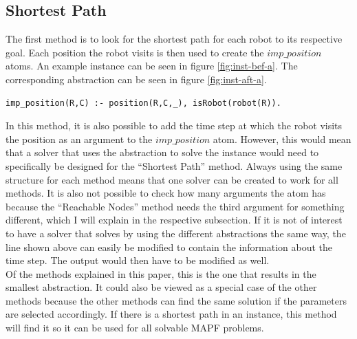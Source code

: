 \documentclass[runningheads]{llncs}
\begin{document}
\subsection{Shortest Path}
The first method is to look for the shortest path for each robot to its respective goal. Each position the robot visits is then used to create the $imp\_position$ atoms. An example instance can be seen in figure \ref{fig:inst-bef-a}. The corresponding abstraction can be seen in figure \ref{fig:inst-aft-a}.
\begin{verbatim}
imp_position(R,C) :- position(R,C,_), isRobot(robot(R)).
\end{verbatim}
In this method, it is also possible to add the time step at which the robot visits the position as an argument to the $imp\_position$ atom. However, this would mean that a solver that uses the abstraction to solve the instance would need to specifically
be designed for the ``Shortest Path'' method. Always using the same structure for each method means that one solver can be created to work for all methods. It is also not possible to check how many arguments the atom has because the 
``Reachable Nodes'' method needs the third argument for something different, which I will explain in the respective subsection. If it is not of interest to have a solver that solves by using the different abstractions the same way, the line shown above can 
easily be modified to contain the information about the time step. The output would then have to be modified as well. \\
Of the methods explained in this paper, this is the one that results in the smallest abstraction. It could also be viewed as a special case of the other methods because the other methods can find the same solution if the parameters are selected accordingly. If there is a shortest path in an instance, this method will find it so it can be used for all solvable
MAPF problems. 
\end{document}
